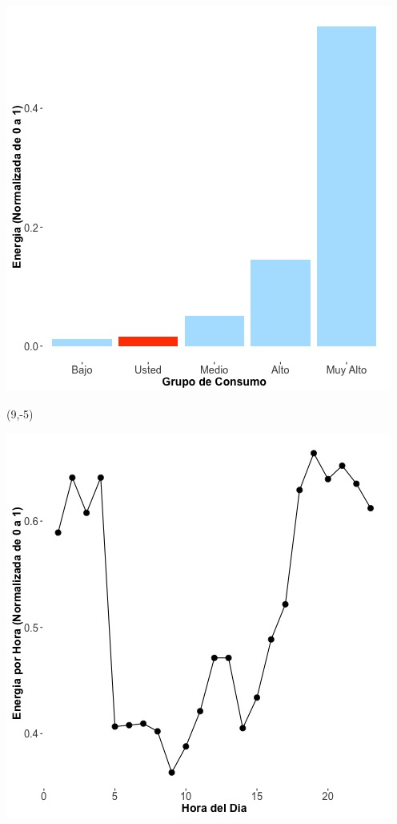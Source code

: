\documentclass{article}\usepackage[]{graphicx}\usepackage[]{color}
\newenvironment{knitrout}{}{} %
\begin{document}
\begin{knitrout}
\color{fgcolor}
\includegraphics[scale=0.65]{figure/A20_neighbor_plot} 
\end{knitrout}

 \begin{textblock}{1}(9,-5)
\begin{minipage}{20em}
\begingroup

\endgroup
\end{minipage}
\end{textblock}


\begin{knitrout}
\color{fgcolor}
\includegraphics[scale=0.65]{figure/A20_plot_norm_median} 
\end{knitrout}
\end{document}

